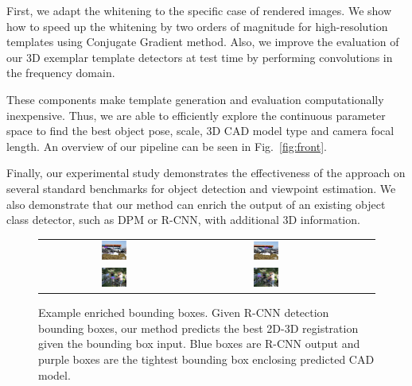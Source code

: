 \documentclass[extendedabs]{bmvc2k}
\begin{document}
First, we adapt the whitening to the specific case of rendered images. We show
how to speed up the whitening by two orders of magnitude for high-resolution
templates using Conjugate Gradient method. Also, we improve the evaluation of
our 3D exemplar template detectors at test time by performing convolutions in
the frequency domain.

These components make template generation and evaluation computationally
inexpensive. Thus, we are able to efficiently explore the continuous parameter
space to find the best object pose, scale, 3D CAD model type and camera focal
length. An overview of our pipeline can be seen in Fig.~\ref{fig:front}.

Finally, our experimental study demonstrates the effectiveness of the
approach on several standard benchmarks for object detection and viewpoint
estimation. We also demonstrate that our method can enrich the output of an
existing object class detector, such as DPM or R-CNN, with additional 3D
information.

\begin{figure}[t]
\small
\setlength\tabcolsep{1pt}
\centering
\begin{tabular}{ccccc}
  \includegraphics[width=0.18\textwidth]{car_cnn/2c.png} &
  \includegraphics[width=0.18\textwidth]{car_cnn/2e.png} \\
  \includegraphics[width=0.18\textwidth]{bicycle_cnn/4b.png} &
  \includegraphics[width=0.18\textwidth]{bicycle_cnn/4c.png} \\
\end{tabular}
\caption{Example enriched bounding boxes. Given R-CNN
	detection bounding boxes, our method predicts the best 2D-3D
	registration given the bounding box input. Blue boxes are R-CNN output and
	purple boxes are the tightest bounding box enclosing predicted CAD model.}
\label{fig:pascal12cnn}
\end{figure}
\end{document}
